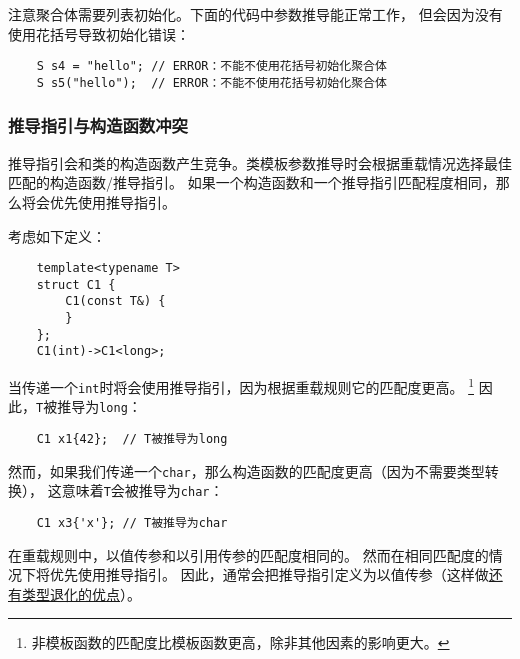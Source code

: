 注意聚合体需要列表初始化。下面的代码中参数推导能正常工作，
但会因为没有使用花括号导致初始化错误：
\begin{lstlisting}
    S s4 = "hello"; // ERROR：不能不使用花括号初始化聚合体
    S s5("hello");  // ERROR：不能不使用花括号初始化聚合体
\end{lstlisting}

\subsubsection{推导指引与构造函数冲突}
推导指引会和类的构造函数产生竞争。类模板参数推导时会根据重载情况选择最佳匹配的构造函数/推导指引。
如果一个构造函数和一个推导指引匹配程度相同，那么将会优先使用推导指引。

考虑如下定义：
\begin{lstlisting}
    template<typename T>
    struct C1 {
        C1(const T&) {
        }
    };
    C1(int)->C1<long>;
\end{lstlisting}
当传递一个\texttt{int}时将会使用推导指引，因为根据重载规则它的匹配度更高。
\footnote{非模板函数的匹配度比模板函数更高，除非其他因素的影响更大。}
因此，\texttt{T}被推导为\texttt{long}：
\begin{lstlisting}
    C1 x1{42};  // T被推导为long
\end{lstlisting}
然而，如果我们传递一个\texttt{char}，那么构造函数的匹配度更高（因为不需要类型转换），
这意味着\texttt{T}会被推导为\texttt{char}：
\begin{lstlisting}
    C1 x3{'x'}; // T被推导为char
\end{lstlisting}
在重载规则中，以值传参和以引用传参的匹配度相同的。
然而在相同匹配度的情况下将优先使用推导指引。
因此，通常会把推导指引定义为以值传参（这样做\hyperref[ch9.2.1]{还有类型退化的优点}）。

